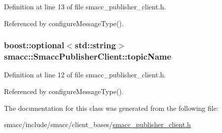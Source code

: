 Definition at line 13 of file smacc\+\_\+publisher\+\_\+client.\+h.



Referenced by configure\+Message\+Type().

\subsubsection[{\texorpdfstring{topic\+Name}{topicName}}]{\setlength{\rightskip}{0pt plus 5cm}boost\+::optional$<$std\+::string$>$ smacc\+::\+Smacc\+Publisher\+Client\+::topic\+Name}\hypertarget{classsmacc_1_1SmaccPublisherClient_a4b8401543c3d532e81453c9106ddaefc}{}\label{classsmacc_1_1SmaccPublisherClient_a4b8401543c3d532e81453c9106ddaefc}


Definition at line 12 of file smacc\+\_\+publisher\+\_\+client.\+h.



Referenced by configure\+Message\+Type().



The documentation for this class was generated from the following file\+:\begin{DoxyCompactItemize}
\item 
smacc/include/smacc/client\+\_\+bases/\hyperlink{smacc__publisher__client_8h}{smacc\+\_\+publisher\+\_\+client.\+h}\end{DoxyCompactItemize}
